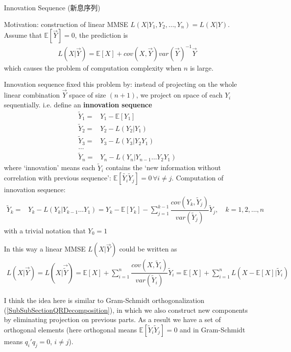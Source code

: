 \begin{point}
    Innovation Sequence (新息序列)
\end{point}

Motivation: construction of linear MMSE $ L(X|Y_1,Y_2,\ldots,Y_n)=L(X|Y) $. Assume that $\mathbb{E}\left[ \vec{Y} \right] =0 $, the prediction is
\begin{align}
    L(X|\vec{Y})=\mathbb{E}\left[ X \right] + cov(X,\vec{Y})var(\vec{Y})^{-1}\vec{Y}
\end{align}
which causes the problem of computation complexity when $ n $ is large. 

Innovation sequence fixed this problem by: instead of projecting on the whole linear combination $ \vec{Y} $ space of size $ (n+1) $, we project on space of each $ Y_i $ sequentially. i.e. define an \textbf{innovation sequence} 
\begin{align}
    \tilde{Y}_1=&Y_1-\mathbb{E}\left[ Y_1 \right] \\
    \tilde{Y}_2=&Y_2-L(Y_2|Y_1)\\
    \tilde{Y}_3=&Y_3-L(Y_3|Y_2Y_1)\\
    \ldots&\\
    \tilde{Y}_n=&Y_n-L(Y_n|Y_{n-1}\ldots Y_2Y_1)
\end{align}
where `innovation' means each $ \tilde{Y}_i $ contains the `new information without correlation with previous sequence': $ \mathbb{E}\left[ \tilde{Y_i}\tilde{Y}_j \right]=0\,\forall i\neq j  $. Computation of innovation sequence:
\begin{align}
     \tilde{Y}_k=&Y_k-L(Y_k|Y_{k-1}\ldots Y_1)=Y_k-\mathbb{E}\left[ Y_k \right] -\sum_{j=1}^{k-1}\dfrac{cov(Y_k,\tilde{Y}_{j})}{var(\tilde{Y}_{j})}\tilde{Y}_j,\quad k=1,2,\ldots,n
\end{align}
with a trivial notation that $ Y_{0}=1 $

In this way a linear MMSE $ L(X|\vec{Y}) $ could be written as
\begin{align}
    L(X|\vec{Y})=L(X|\vec{\tilde{Y}})= \mathbb{E}\left[ X \right] +\sum_{i=1}^n \dfrac{cov(X,\tilde{Y}_i)}{var(\tilde{Y}_i)}\tilde{Y}_i=\mathbb{E}\left[ X \right] +\sum_{i=1}^n L\left(X-\mathbb{E}\left[ X \right] |\tilde{Y}_i\right)
\end{align}


I think the idea here is similar to Gram-Schmidt orthogonalization (\autoref{SubSubSectionQRDecomposition}), in which we also construct new components by eliminating projection on previous parts. As a result we have a set of orthogonal elements (here orthogonal means $ \mathbb{E}\left[ \tilde{Y}_i\tilde{Y}_j \right]=0  $ and in Gram-Schmidt means $ q_i'q_j = 0 $, $ i\neq j $).



